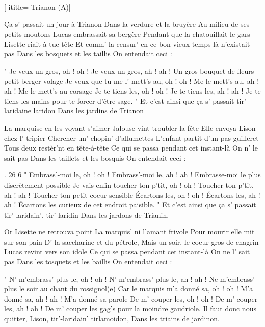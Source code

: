  [
ititle= {Trianon (A)}]

\beginverse
Ça s' passait un jour à Trianon
Dans la verdure et la bruyère
Au milieu de ses petits moutons
Lucas embrassait sa bergère
Pendant que la chatouillait le gars
Lisette riait à tue-tête
Et comm' la censur' en ce bon vieux temps-là n'existait pas
Dans les bosquets et les taillis
On entendait ceci :
\endchorus

\beginchorus
" Je veux un gros, oh ! oh !
Je veux un gros, ah ! ah !
Un gros bouquet de fleurs petit berger volage
Je veux que tu me l' mett's au, oh ! oh !
Me le mett's au, ah ! ah !
Me le mett's au corsage
Je te tiens les, oh ! oh !
Je te tiens les, ah ! ah !
Je te tiens les mains pour te forcer d'être sage. "
Et c'est ainsi que ça s' passait tir'-laridaine laridon
Dans les jardins de Trianon
\endchorus

\beginverse
La marquise en les voyant s'aimer
Jalouse vint troubler la fête
Elle envoya Lison chez l' tripier
Chercher un' chopin' d'allumettes
L'enfant partit d'un pas guilleret
Tous deux restèr'nt en tête-à-tête
Ce qui se passa pendant cet instant-là
On n' le sait pas
Dans les taillets et les bosquis
On entendait ceci :
\endverse

. 
26 6
" Embrass'-moi le, oh ! oh !
Embrass'-moi le, ah ! ah !
Embrasse-moi le plus discrètement possible
Je vais enfin toucher ton p'tit, oh ! oh !
Toucher ton p'tit, ah ! ah !
Toucher ton petit coeur sensible
Écartons les, oh ! oh !
Écartons les, ah ! ah !
Écartons les curieux de cet endroit paisible. "
Et c'est ainsi que ça s' passait tir'-laridain', tir' laridin
Dans les jardons de Trianin.
\endchorus

\beginverse
Or Lisette ne retrouva point
La marquis' ni l'amant frivole
Pour mourir elle mit sur son pain
D' la saccharine et du pétrole,
Mais un soir, le coeur gros de chagrin
Lucas revint vers son idole
Ce qui se passa pendant cet instant-là
On ne l' sait pas
Dans les tosquets et les baillis
On entendait ceci :
\endeverse

\beginchorus
" N' m'embrass' plus le, oh ! oh !
N' m'embrass' plus le, ah ! ah !
Ne m'embrass' plus le soir au chant du rossignol(e)
Car le marquis m'a donné sa, oh ! oh !
M'a donné sa, ah ! ah !
M'a donné sa parole
De m' couper les, oh ! oh !
De m' couper les, ah ! ah !
De m' couper les gag's pour la moindre gaudriole.
Il faut donc nous quitter, Lison, tir'-laridain' tirlamoidon,
Dans les triains de jardinon.
\endchorus

\endsong